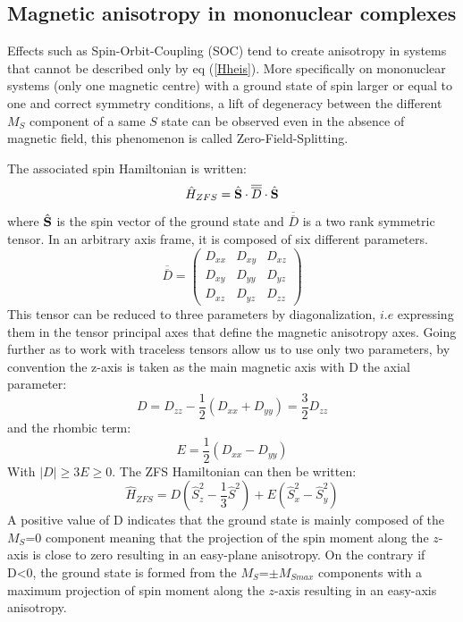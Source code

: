 \documentclass[12pt]{report}
\numberwithin{equation}{section}
\begin{document}
\subsection{Magnetic anisotropy in mononuclear complexes}

\par Effects such as Spin-Orbit-Coupling (SOC) tend to create anisotropy in systems that cannot be described only by eq (\ref{Hheis}). 
More specifically on mononuclear systems (only one magnetic centre) with a ground state of spin larger or equal to one and correct symmetry conditions, a lift of degeneracy between the different $M_S$ component of a same $S$ state can be observed even in the absence of magnetic field, this phenomenon is called Zero-Field-Splitting.

The associated spin Hamiltonian is written:
\begin{equation}\label{SDS}
    \hat{H}_{ZFS}=\hat{\vb S} \cdot \overline{\overline{D}} \cdot \hat{\vb S}
\end{equation}
where $\hat{\vb S}$ is the spin vector of the ground state and $\overline{\overline{D}}$ is a two rank symmetric tensor. In an arbitrary axis frame, it is composed of six different parameters.
\begin{equation}
    \overline{\overline{D}}=\begin{pmatrix}
        D_{xx} & D_{xy} & D_{xz}\\
        D_{xy} & D_{yy} & D_{yz}\\
        D_{xz} & D_{yz} & D_{zz}
    \end{pmatrix}
\end{equation}
This tensor can be reduced to three parameters by diagonalization, $\textit{i.e}$ expressing them in the tensor principal axes that define the magnetic anisotropy axes.
Going further as to work with traceless tensors allow us to use only two parameters, by convention the z-axis is taken as the main magnetic axis with D the axial parameter:
\begin{equation}\label{ParametreD}
    D=D_{zz}-\frac{1}{2}(D_{xx}+D_{yy})=\frac{3}{2}D_{zz}
\end{equation}
and the rhombic term:
\begin{equation}\label{ParametreE}
    E=\frac{1}{2}(D_{xx}-D_{yy})
\end{equation}
With $|D| \geq 3E \geq 0$. 
The ZFS Hamiltonian can then be written:
\begin{equation}\label{HZFS}
    \hat{H}_{ZFS}=D (\hat{S}_z^2-\frac{1}{3}\hat{S}^2)+E(\hat{S}_x^2-\hat{S}_y^2)
\end{equation}
A positive value of D indicates that the ground state is mainly composed of the $M_S$=0 component meaning that the projection of the spin moment along the $z$-axis is close to zero resulting in an easy-plane anisotropy. 
On the contrary if D<0, the ground state is formed from the $M_S$=$\pm M_{Smax}$ components with a maximum projection of spin moment along the $z$-axis resulting in an easy-axis anisotropy.
\end{document}
